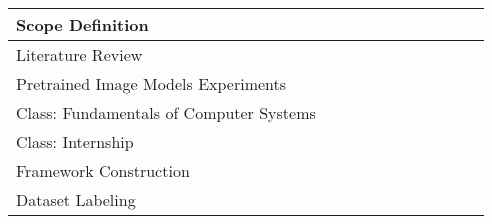 \begin{table}[h]
\begin{tabular}{lllllllllll}
Scope Definition                                      &                          &                          &                          & \cellcolor[HTML]{FFCCC9} &                          &                          &                          &                                              &                                              &                          \\ \hline
Literature Review                                     &                          &                          &                          &                          & \cellcolor[HTML]{96FFFB} &                          &                          &                                              &                                              &                          \\ \hline
Pretrained Image Models Experiments                   &                          &                          &                          &                          & \cellcolor[HTML]{96FFFB} &                          &                          &                                              &                                              &                          \\ \hline
Class: Fundamentals of Computer Systems               &                          &                          &                          &                          & \cellcolor[HTML]{9AFF99} & \cellcolor[HTML]{9AFF99} &                          &                                              &                                              &                          \\ \hline
Class: Internship                                     &                          &                          &                          &                          & \cellcolor[HTML]{9AFF99} & \cellcolor[HTML]{9AFF99} &                          &                                              &                                              &                          \\ \hline
Framework Construction                                &                          &                          &                          &                          & \cellcolor[HTML]{96FFFB} & \cellcolor[HTML]{96FFFB} &                          &                                              &                                              &                          \\ \hline
Dataset Labeling                                      &                          &                          &                          &                          &                          & \cellcolor[HTML]{96FFFB} &                          &                                              &                                              &                          \\ \hline

\end{tabular}
\end{table}
